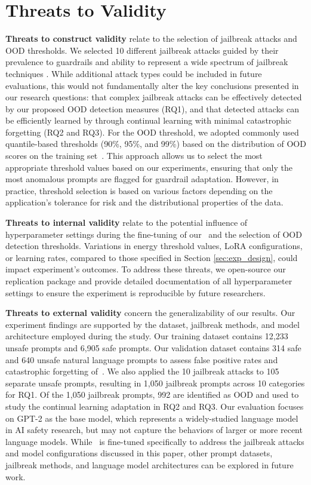 \section{Threats to Validity}
\label{sec:threats}
\textbf{Threats to construct validity} relate to the selection of jailbreak attacks and OOD thresholds.
We selected 10 different jailbreak attacks guided by their prevalence to guardrails and ability to represent a wide spectrum of jailbreak techniques \cite{dong2024safeguarding, yi2024jailbreak, wei2024jailbroken}. 
While additional attack types could be included in future evaluations, this would not fundamentally alter the key conclusions presented in our research questions: that complex jailbreak attacks can be effectively detected by our proposed OOD detection measures (RQ1), and that detected attacks can be efficiently learned by \ourapp through continual learning with minimal catastrophic forgetting (RQ2 and RQ3).
%
For the OOD threshold, we adopted commonly used quantile-based thresholds (90\%, 95\%, and 99\%) based on the distribution of OOD scores on the training set~\cite{liu2020energy,lee2018simple}. This approach allows us to select the most appropriate threshold values based on our experiments, ensuring that only the most anomalous prompts are flagged for guardrail adaptation. However, in practice, threshold selection is based on various factors depending on the application's tolerance for risk and the distributional properties of the data. 

\textbf{Threats to internal validity} relate to the potential influence of hyperparameter settings during the fine-tuning of our \ourapp~and the selection of OOD detection thresholds. Variations in energy threshold values, LoRA configurations, or learning rates, compared to those specified in Section \ref{sec:exp_design}, could impact experiment's outcomes. 
To address these threats, we open-source our replication package and provide detailed documentation of all hyperparameter settings to ensure the experiment is reproducible by future researchers. 

\textbf{Threats to external validity} concern the generalizability of our results. Our experiment findings are supported by the dataset, jailbreak methods, and model architecture employed during the study. Our training dataset contains 12,233 unsafe prompts and 6,905 safe prompts. Our  validation dataset contains 314 safe and 640 unsafe natural language prompts to assess false positive rates and catastrophic forgetting of~\ourapp. We also applied the 10 jailbreak attacks to 105 separate unsafe prompts, resulting in 1,050 jailbreak prompts across 10 categories for RQ1. Of the 1,050 jailbreak prompts, 992 are identified as OOD and used to study the continual learning adaptation in RQ2 and RQ3.
Our evaluation focuses on GPT-2 as the base model, which represents a widely-studied language model in AI safety research, but may not capture the behaviors of larger or more recent language models.
While \ourapp~is fine-tuned specifically to address the jailbreak attacks and model configurations discussed in this paper, other prompt datasets, jailbreak methods, and language model architectures can be explored in future work.


